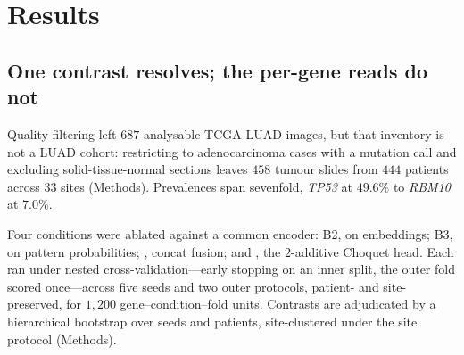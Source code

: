 
\section*{Results}

\subsection*{One contrast resolves; the per-gene reads do not}

Quality filtering left $687$ analysable TCGA-LUAD images, but that
inventory is not a LUAD cohort: restricting to adenocarcinoma cases with
a mutation call and excluding solid-tissue-normal sections leaves $458$
tumour slides from $444$ patients across $33$ sites (Methods).
Prevalences span sevenfold, \textit{TP53} at $49.6\%$
to \textit{RBM10} at $7.0\%$.

Four conditions were ablated against a common \ctranspath{}
encoder\cite{wang2022ctranspath}: B2, \abmil{} on embeddings; B3,
\abmil{} on pattern probabilities; \piabmil{}, concat fusion; and
\fcmil{}, the $2$-additive Choquet head. Each ran under nested
cross-validation---early stopping on an inner split, the outer fold
scored once---across five seeds and two outer protocols, patient- and
site-preserved, for $1{,}200$ gene--condition--fold units. Contrasts are
adjudicated by a hierarchical bootstrap over seeds and patients,
site-clustered under the site protocol (Methods).

